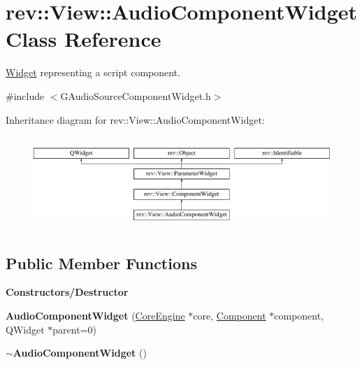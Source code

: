 \hypertarget{classrev_1_1_view_1_1_audio_component_widget}{}\section{rev\+::View\+::Audio\+Component\+Widget Class Reference}
\label{classrev_1_1_view_1_1_audio_component_widget}


\mbox{\hyperlink{class_widget}{Widget}} representing a script component.  




{\ttfamily \#include $<$G\+Audio\+Source\+Component\+Widget.\+h$>$}

Inheritance diagram for rev\+::View\+::Audio\+Component\+Widget\+:\begin{figure}[H]
\begin{center}
\leavevmode
\includegraphics[height=3.505477cm]{classrev_1_1_view_1_1_audio_component_widget}
\end{center}
\end{figure}
\subsection*{Public Member Functions}
\begin{Indent}\textbf{ Constructors/\+Destructor}\par
\begin{DoxyCompactItemize}
\item 
\mbox{\label{classrev_1_1_view_1_1_audio_component_widget_aa0cb8792f82e2b5f392f8212d5ef2f2c}} 
{\bfseries Audio\+Component\+Widget} (\mbox{\hyperlink{classrev_1_1_core_engine}{Core\+Engine}} $\ast$core, \mbox{\hyperlink{classrev_1_1_component}{Component}} $\ast$component, Q\+Widget $\ast$parent=0)
\item 
\mbox{\label{classrev_1_1_view_1_1_audio_component_widget_a8f0f150d9a4eeb2b793f1a824b69c3d1}} 
{\bfseries $\sim$\+Audio\+Component\+Widget} ()
\end{DoxyCompactItemize}
\end{Indent}

